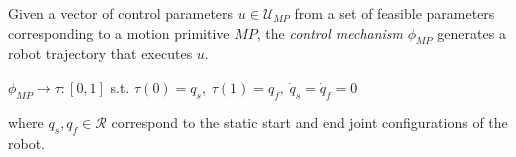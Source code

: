 \begin{definition}\label{def:control-mechanism}
Given a vector of control parameters $u \in \mathcal{U}_{MP}$ from a set of feasible parameters corresponding to a motion primitive $MP$, the \textsl{control mechanism} $\phi_{MP}$ generates a robot trajectory that executes $u$.
\begin{center}
$\phi_{MP} \longrightarrow \tau: [0, 1]$ s.t. $\tau(0) = q_s, \hspace{3pt} \tau(1) = q_f, \hspace{3pt} \dot{q}_s = \dot{q}_f = 0$
\end{center}
where $q_s, q_f \in \mathcal{R}$ correspond to the static start and end joint configurations of the robot.
\end{definition}
